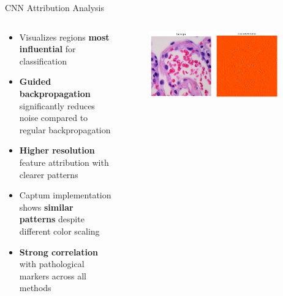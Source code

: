 \documentclass[aspectratio=169,8pt]{beamer}  %
\begin{document}
\begin{frame}{CNN Attribution Analysis}
\begin{columns}[T]
\begin{column}{0.5\textwidth}
\begin{itemize}
\item Visualizes regions \textbf{most influential} for classification
\item \textbf{Guided backpropagation} significantly reduces noise compared to regular backpropagation
\item \textbf{Higher resolution} feature attribution with clearer patterns
\item Captum implementation shows \textbf{similar patterns} despite different color scaling
\item \textbf{Strong correlation} with pathological markers across all methods
\end{itemize}
\end{column}
\begin{column}{0.5\textwidth}
\begin{figure}
\includegraphics[width=0.45\textwidth]{imgs/normal_image.png}
\vspace{0.2cm}
\includegraphics[width=0.45\textwidth]{imgs/cnn_bp.png}
\vspace{0.2cm}

\end{figure}
\end{column}
\end{columns}
\end{frame}
\end{document}
